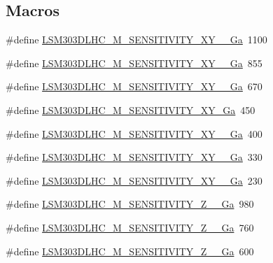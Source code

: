 \subsection*{Macros}
\begin{DoxyCompactItemize}
\item 
\#define \hyperlink{group__Magnetometer__Sensitivity_ga26db3d6eb4046c0f7b2f6df539165043}{L\+S\+M303\+D\+L\+H\+C\+\_\+\+M\+\_\+\+S\+E\+N\+S\+I\+T\+I\+V\+I\+T\+Y\+\_\+\+X\+Y\+\_\+\_\+Ga}~1100
\item 
\#define \hyperlink{group__Magnetometer__Sensitivity_ga55be5ae37451e7ffb94184d76340cba0}{L\+S\+M303\+D\+L\+H\+C\+\_\+\+M\+\_\+\+S\+E\+N\+S\+I\+T\+I\+V\+I\+T\+Y\+\_\+\+X\+Y\+\_\+\_\+Ga}~855
\item 
\#define \hyperlink{group__Magnetometer__Sensitivity_ga55a81c3b9f322d35791be50b4948384a}{L\+S\+M303\+D\+L\+H\+C\+\_\+\+M\+\_\+\+S\+E\+N\+S\+I\+T\+I\+V\+I\+T\+Y\+\_\+\+X\+Y\+\_\+\_\+Ga}~670
\item 
\#define \hyperlink{group__Magnetometer__Sensitivity_ga2a4190d7be4fc05fb5f0c36337db9639}{L\+S\+M303\+D\+L\+H\+C\+\_\+\+M\+\_\+\+S\+E\+N\+S\+I\+T\+I\+V\+I\+T\+Y\+\_\+\+X\+Y\+\_\+Ga}~450
\item 
\#define \hyperlink{group__Magnetometer__Sensitivity_gad542b929022f73b23ca5a58598d6d6e8}{L\+S\+M303\+D\+L\+H\+C\+\_\+\+M\+\_\+\+S\+E\+N\+S\+I\+T\+I\+V\+I\+T\+Y\+\_\+\+X\+Y\+\_\+\_\+Ga}~400
\item 
\#define \hyperlink{group__Magnetometer__Sensitivity_ga90b1eead9a87a33c05d16f16e00d8205}{L\+S\+M303\+D\+L\+H\+C\+\_\+\+M\+\_\+\+S\+E\+N\+S\+I\+T\+I\+V\+I\+T\+Y\+\_\+\+X\+Y\+\_\+\_\+Ga}~330
\item 
\#define \hyperlink{group__Magnetometer__Sensitivity_gac743e08abd43c3d9cf62029c7836402d}{L\+S\+M303\+D\+L\+H\+C\+\_\+\+M\+\_\+\+S\+E\+N\+S\+I\+T\+I\+V\+I\+T\+Y\+\_\+\+X\+Y\+\_\+\_\+Ga}~230
\item 
\#define \hyperlink{group__Magnetometer__Sensitivity_ga65298a8e4a12800afa79235116b23d21}{L\+S\+M303\+D\+L\+H\+C\+\_\+\+M\+\_\+\+S\+E\+N\+S\+I\+T\+I\+V\+I\+T\+Y\+\_\+\+Z\+\_\+\_\+Ga}~980
\item 
\#define \hyperlink{group__Magnetometer__Sensitivity_ga0abf207cd0b811f933a6dafee20fd9ec}{L\+S\+M303\+D\+L\+H\+C\+\_\+\+M\+\_\+\+S\+E\+N\+S\+I\+T\+I\+V\+I\+T\+Y\+\_\+\+Z\+\_\+\_\+Ga}~760
\item 
\#define \hyperlink{group__Magnetometer__Sensitivity_ga0018387b0dd96751b2cc57b719323677}{L\+S\+M303\+D\+L\+H\+C\+\_\+\+M\+\_\+\+S\+E\+N\+S\+I\+T\+I\+V\+I\+T\+Y\+\_\+\+Z\+\_\+\_\+Ga}~600

\end{DoxyCompactItemize}
